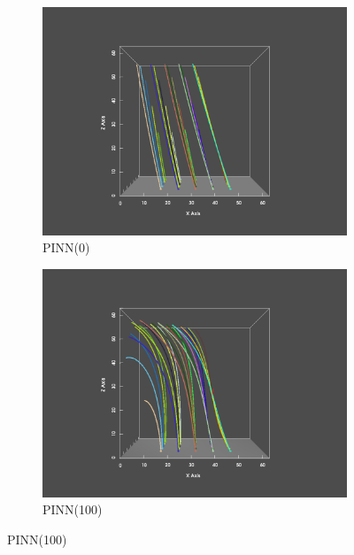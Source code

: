 \begin{figure}
  \begin{subfigure}{.5\linewidth}
    \centering
    \caption{PINN(0)}\label{fig:xz0}
    \includegraphics[trim={6cm 1cm 6cm 2cm}, clip, width=\linewidth]{"img/PINN_000000_xz.pdf"}
  \end{subfigure}%
  \begin{subfigure}{.5\linewidth}
    \centering
    \caption{PINN(100)}
    \includegraphics[trim={6cm 1cm 6cm 2cm}, clip, width=\linewidth]{"img/PINN_000100_xz.pdf"}
  \end{subfigure}


\end{figure}
